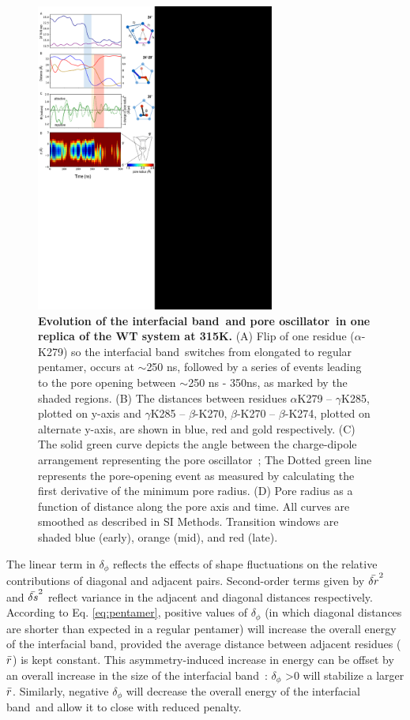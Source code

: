 \documentclass[journal=jacsat,manuscript=article]{achemso}
\newcommand{\fivering}{interfacial band~}
\newcommand{\fiveringnos}{interfacial band}
\newcommand{\triad}{pore oscillator~}
\newcommand{\WT}{WT\xspace}
\begin{document}
\begin{figure}[t]
\begin{center}
\includegraphics[height = 4in]{figures_2/cartoon_theory.pdf}
\caption{{\bf Evolution of the \fivering and \triad in one replica of the \WT system at 315K.} (A) Flip of one residue ($\alpha$-K279) so the \fivering switches from elongated to regular pentamer, occurs at $\sim$250 ns, followed by a series of events leading to the pore opening between $\sim$250 ns - 350ns, as marked by the shaded regions. (B) The distances between residues $\alpha$K279 -- $\gamma$K285, plotted on y-axis and  $\gamma$K285 -- $\beta$-K270, $\beta$-K270 -- $\beta$-K274, plotted on alternate y-axis, are shown in blue, red and gold respectively. (C) The solid green curve depicts the angle between the charge-dipole arrangement representing the \triad; The Dotted green line represents the pore-opening event as measured by calculating the  first derivative of the minimum pore radius. (D) Pore radius as a function of distance along the pore axis and time.  All curves are smoothed as described in SI Methods.  Transition windows are shaded blue (early), orange (mid), and red (late).   }
\label{fig:theory}
\end{center}
\end{figure}

The linear term in $\delta_{\phi}$ reflects the effects of shape fluctuations on the relative contributions of diagonal and adjacent pairs.   Second-order terms given by $\bar{\delta r}^{2}$ and $\bar{\delta s}^{2}$ reflect variance in the adjacent and diagonal distances respectively.  According to Eq. \ref{eq:pentamer}, positive values of $\delta_{\phi}$ (in which diagonal distances are shorter than expected in a regular pentamer) will increase the overall energy of the \fiveringnos, provided the average distance between adjacent residues ($\bar{r}$) is kept constant.  This asymmetry-induced increase in energy can be offset by an overall increase in the size of the \fivering: $\delta_{\phi}$ >0  will stabilize a larger $\bar{r}$.  Similarly, negative $\delta_{\phi}$ will decrease the overall energy of the \fivering and allow it to close with reduced penalty.  
\end{document}
